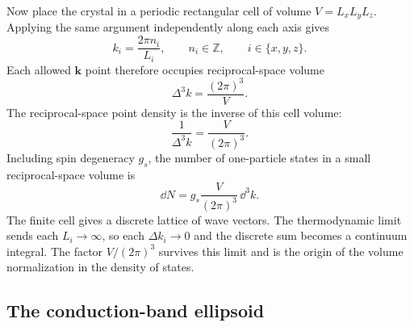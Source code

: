 Now place the crystal in a periodic rectangular cell of volume
$V=L_xL_yL_z$.  Applying the same argument independently along each axis gives
\begin{equation}
  k_i=\frac{2\pi n_i}{L_i},
  \qquad n_i\in\mathbb Z,
  \qquad i\in\{x,y,z\}.
  \label{eq:periodic-three-dimensional-wave-vectors}
\end{equation}
Each allowed $\bm k$ point therefore occupies reciprocal-space volume
\begin{equation}
  \Delta^3k
  =\frac{(2\pi)^3}{V}.
  \label{eq:k-space-cell-volume}
\end{equation}
The reciprocal-space point density is the inverse of this cell volume:
\begin{equation}
  \frac{1}{\Delta^3k}
  =\frac{V}{(2\pi)^3}.
  \label{eq:k-space-point-density}
\end{equation}
Including spin degeneracy $g_s$, the number of one-particle states in a small
reciprocal-space volume is
\begin{equation}
  \dd N
  =g_s\frac{V}{(2\pi)^3}\,\dd^3k.
  \label{eq:k-space-state-counting}
\end{equation}
The finite cell gives a discrete lattice of wave vectors.  The thermodynamic
limit sends each $L_i\to\infty$, so each $\Delta k_i\to0$ and the discrete sum
becomes a continuum integral.  The factor $V/(2\pi)^3$ survives this limit and
is the origin of the volume normalization in the density of states.

\subsection{The conduction-band ellipsoid}

